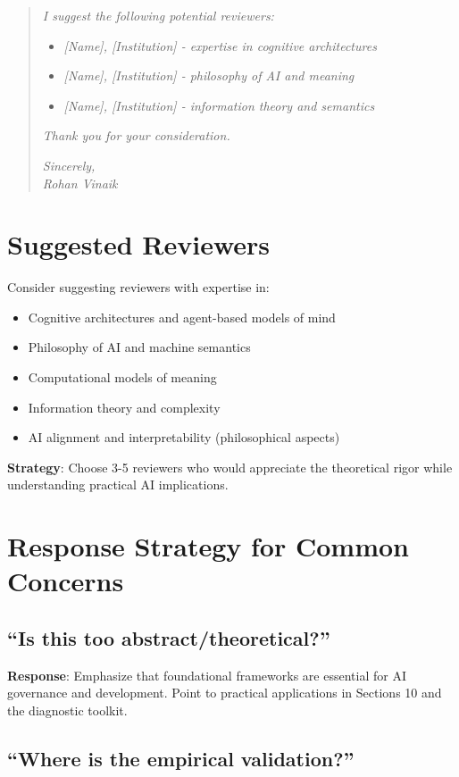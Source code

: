 \documentclass[12pt]{article}
\begin{document}
\begin{quote}
\textit{I suggest the following potential reviewers:}
\begin{itemize}
\item \textit{[Name], [Institution] - expertise in cognitive architectures}
\item \textit{[Name], [Institution] - philosophy of AI and meaning}
\item \textit{[Name], [Institution] - information theory and semantics}
\end{itemize}

\textit{Thank you for your consideration.}

\textit{Sincerely,}\\
\textit{Rohan Vinaik}
\end{quote}

\section{Suggested Reviewers}

Consider suggesting reviewers with expertise in:
\begin{itemize}[leftmargin=*]
\item Cognitive architectures and agent-based models of mind
\item Philosophy of AI and machine semantics
\item Computational models of meaning
\item Information theory and complexity
\item AI alignment and interpretability (philosophical aspects)
\end{itemize}

\textbf{Strategy}: Choose 3-5 reviewers who would appreciate the theoretical rigor while understanding practical AI implications.

\section{Response Strategy for Common Concerns}

\subsection{``Is this too abstract/theoretical?''}

\textbf{Response}: Emphasize that foundational frameworks are essential for AI governance and development. Point to practical applications in Sections 10 and the diagnostic toolkit.

\subsection{``Where is the empirical validation?''}
\end{document}
